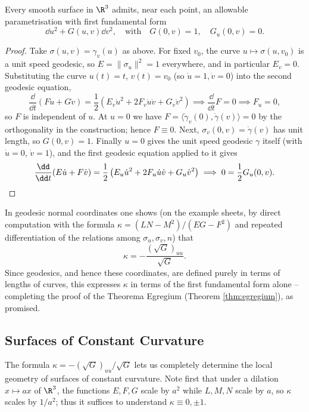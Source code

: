 \begin{corollary}\label{cor:geodesicnormalcoords}
    Every smooth surface in $\R^3$ admits, near each point, an allowable parametrisation with first fundamental form
    $$
    \dd u^2 + G(u, v) \dd v^2, \quad \text{with} \quad G(0, v) = 1, \quad G_u(0, v) = 0.
    $$
\end{corollary}
\begin{proof}
    Take $\sigma(u, v) = \gamma_v(u)$ as above. For fixed $v_0$, the curve $u \mapsto \sigma(u, v_0)$ is a unit speed geodesic, so $E = \|\sigma_u\|^2 = 1$ everywhere, and in particular $E_v = 0$. Substituting the curve $u(t) = t$, $v(t) = v_0$ (so $\dot u = 1, \dot v = 0$) into the second geodesic equation,
    $$
    \frac{\dd}{\dd t}\left(F \dot u + G \dot v\right) = \frac{1}{2}\left(E_v \dot u^2 + 2 F_v \dot u \dot v + G_v \dot v^2\right) \implies \frac{\dd}{\dd t} F = 0 \implies F_u = 0,
    $$
    so $F$ is independent of $u$. At $u = 0$ we have $F = \langle \dot\gamma_v(0), \dot\gamma(v)\rangle = 0$ by the orthogonality in the construction; hence $F \equiv 0$. Next, $\sigma_v(0, v) = \dot\gamma(v)$ has unit length, so $G(0, v) = 1$. Finally $u = 0$ gives the unit speed geodesic $\gamma$ itself (with $\dot u = 0$, $\dot v = 1$), and the first geodesic equation applied to it gives
    $$
    \frac{\dd}{\dd t}(E \dot u + F \dot v) = \frac{1}{2}\left(E_u \dot u^2 + 2F_u \dot u \dot v + G_u \dot v^2\right) \implies 0 = \frac{1}{2}G_u(0, v). \qedhere
    $$
\end{proof}

In geodesic normal coordinates one shows (on the example sheets, by direct computation with the formula $\kappa = (LN - M^2)/(EG - F^2)$ and repeated differentiation of the relations among $\sigma_u, \sigma_v, n$) that
$$
\kappa = -\frac{\left(\sqrt{G}\right)_{uu}}{\sqrt{G}}.
$$
Since geodesics, and hence these coordinates, are defined purely in terms of lengths of curves, this expresses $\kappa$ in terms of the first fundamental form alone -- completing the proof of the Theorema Egregium (Theorem \ref{thm:egregium}), as promised.

\subsection{Surfaces of Constant Curvature}

The formula $\kappa = -(\sqrt{G})_{uu}/\sqrt{G}$ lets us completely determine the local geometry of surfaces of constant curvature. Note first that under a dilation $x \mapsto ax$ of $\R^3$, the functions $E, F, G$ scale by $a^2$ while $L, M, N$ scale by $a$, so $\kappa$ scales by $1/a^2$; thus it suffices to understand $\kappa \equiv 0, \pm 1$.

